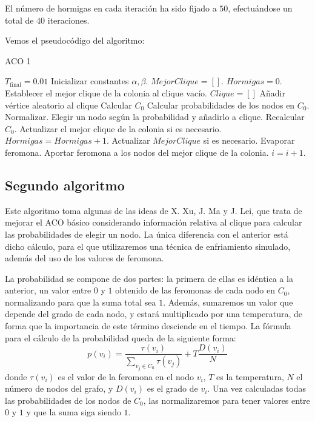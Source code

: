 El número de hormigas en cada iteración ha sido fijado a $50$, efectuándose un total
de $40$ iteraciones.

Vemos el pseudocódigo del algoritmo:

\begin{algorithm}[H]
\caption{ACO 1}
  \begin{algorithmic}
    \State $T_{\text{final}} = 0.01$
    \State Inicializar constantes $\alpha, \beta$.
    \State $Mejor Clique = []$.
    \Repeat
    \State $Hormigas = 0$.
      \State Establecer el mejor clique de la colonia al clique vacío.
      \Repeat
        \State $Clique = []$
        \State Añadir vértice aleatorio al clique
        \State Calcular $C_0$
        \Repeat
          \State Calcular probabilidades de los nodos en $C_0$. Normalizar.
          \State Elegir un nodo según la probabilidad y añadirlo a clique.
          \State Recalcular $C_0$.
        \State Actualizar el mejor clique de la colonia si es necesario.
        \State $Hormigas = Hormigas + 1$.
      \State Actualizar $Mejor Clique$ si es necesario.
      \State Evaporar feromona.
      \State Aportar feromona a los nodos del mejor clique de la colonia.
      \State $i = i+1$.
  \end{algorithmic}
\end{algorithm}


\subsection{Segundo algoritmo}

Este algoritmo toma algunas de las ideas de X. Xu, J. Ma y J. Lei, que trata de
mejorar el ACO básico considerando información relativa al clique para calcular
las probabilidades de elegir un nodo. La única diferencia con el anterior está
dicho cálculo, para el que utilizaremos una técnica de enfriamiento simulado,
además del uso de los valores de feromona.

La probabilidad se compone de dos partes: la primera de ellas es idéntica a la
anterior, un valor entre $0$ y $1$ obtenido de las feromonas de cada nodo en $C_0$,
normalizando para que la suma total sea $1$. Además, sumaremos un valor que depende
del grado de cada nodo, y estará multiplicado por una temperatura, de forma que la
importancia de este término desciende en el tiempo. La fórmula para el cálculo
de la probabilidad queda de la siguiente forma:
\[ p(v_i) = \frac{\tau(v_i)}{\sum_{v_j \in C_0} \tau(v_j)} + T \frac{D(v_i)}{N} \]
donde $\tau(v_i)$ es el valor de la feromona en el nodo $v_i$, $T$ es la temperatura,
$N$ el número de nodos del grafo, y $D(v_i)$ es el grado de $v_i$. Una vez calculadas
todas las probabilidades de los nodos de $C_0$, las normalizaremos para tener valores
entre $0$ y $1$ y que la suma siga siendo $1$.

